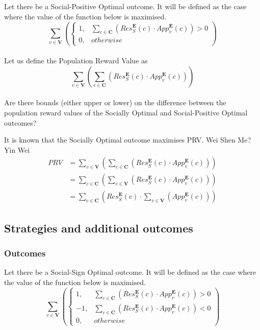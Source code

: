 \documentclass{article}
\begin{document}
Let there be a Social-Positive Optimal outcome. It will be defined as the case where the value of the function below is maximised.
\begin{equation}
\sum^{}_{v \in \pmb{V}}{\left(
\begin{cases}
1, & \sum^{}_{c \in \pmb{C}}{(Res^{\pmb{E}}_{S}(c) \cdot App^{\pmb{E}}_{v}(c))} > 0\\
0, & {otherwise}
\end{cases}
\right)}
\end{equation}\\

Let us define the Population Reward Value as
\begin{equation}
\sum^{}_{v \in \pmb{V}}{\left(
\sum^{}_{c \in \pmb{C}}{\left(
Res^{\pmb{E}}_{S}(c) \cdot App^{\pmb{E}}_{v}(c)
\right)}
\right)}
\end{equation}\\

Are there bounds (either upper or lower) on the difference between the population reward values of the Socially Optimal and Social-Positive Optimal outcomes?

It is known that the Socially Optimal outcome maximises PRV. Wei Shen Me? Yin Wei
\begin{equation}
\begin{aligned}
PRV
&= \sum^{}_{v \in \pmb{V}}{\left(\sum^{}_{c \in \pmb{C}}{\left(Res^{\pmb{E}}_{S}(c) \cdot App^{\pmb{E}}_{v}(c)\right)}\right)}\\
&= \sum^{}_{c \in \pmb{C}}{\left(\sum^{}_{v \in \pmb{V}}{\left(Res^{\pmb{E}}_{S}(c) \cdot App^{\pmb{E}}_{v}(c)\right)}\right)}\\
&= \sum^{}_{c \in \pmb{C}}{\left(Res^{\pmb{E}}_{S}(c) \cdot \sum^{}_{v \in \pmb{V}}{\left(App^{\pmb{E}}_{v}(c)\right)}\right)}
\end{aligned}
\end{equation}


\subsection{Strategies and additional outcomes}

\subsubsection{Outcomes}

Let there be a Social-Sign Optimal outcome. It will be defined as the case where the value of the function below is maximised.
\begin{equation}
\sum^{}_{v \in \pmb{V}}{\left(
\begin{cases}
1, & \sum^{}_{c \in \pmb{C}}{(Res^{\pmb{E}}_{S}(c) \cdot App^{\pmb{E}}_{v}(c))} > 0\\
-1, & \sum^{}_{c \in \pmb{C}}{(Res^{\pmb{E}}_{S}(c) \cdot App^{\pmb{E}}_{v}(c))} < 0\\
0, & {otherwise}
\end{cases}
\right)}
\end{equation}\\
\end{document}
